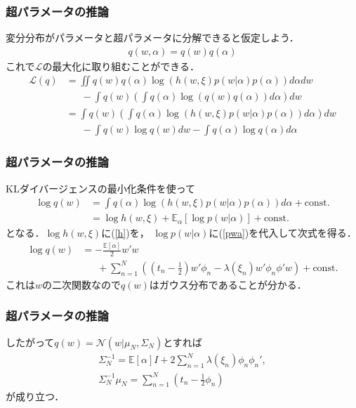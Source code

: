 \documentclass[10pt,usepdftitle=false,hyperref={unicode}]{beamer}
\newcommand{\paref}[1]{{\fontfamily{cmr}\selectfont (\ref{#1})}}
\newcommand{\parentheses}[1]{\left(#1\right)}
\newcommand{\brackets}[1]{\left[#1\right]}
\newcommand{\const}{\mathrm{const.}}
\newcommand{\energy}{\mathcal{L}}
\begin{document}
\begin{frame}
\frametitle{超パラメータの推論}
変分分布がパラメータと超パラメータに分解できると仮定しよう．
\begin{align}
    q\parentheses{w, \alpha} = q\parentheses{w}q\parentheses{\alpha} \tag{10.173}
\end{align}
これで$\energy$の最大化に取り組むことができる．
\begin{align*}
    \energy\parentheses{q}
    &= \iint q\parentheses{w}q\parentheses{\alpha} \log \parentheses{h\parentheses{w,\xi}p\parentheses{w|\alpha}p\parentheses{\alpha}} d\alpha dw \\
    &\phantom{=}\ -\int q\parentheses{w}\parentheses{\int q\parentheses{\alpha} \log\parentheses{q\parentheses{w}q\parentheses{\alpha}} d\alpha} dw \\
    &= \int q\parentheses{w}\parentheses{\int q\parentheses{\alpha} \log \parentheses{h\parentheses{w,\xi}p\parentheses{w|\alpha}p\parentheses{\alpha}} d\alpha} dw \\
    &\phantom{=}\ -\int q\parentheses{w} \log q\parentheses{w} dw
            -\int q\parentheses{\alpha} \log q\parentheses{\alpha} d\alpha
\end{align*}
\end{frame}

\begin{frame}
\frametitle{超パラメータの推論}
KLダイバージェンスの最小化条件を使って
\begin{align*}
    \log q\parentheses{w}
    &= \int q\parentheses{\alpha} \log \parentheses{h\parentheses{w,\xi}p\parentheses{w|\alpha}p\parentheses{\alpha}} d\alpha + \const \\
    &= \log h\parentheses{w,\xi} + \mathbb{E}_\alpha \brackets{\log p\parentheses{w|\alpha}} + \const
\end{align*}
となる．$\log h\parentheses{w,\xi}$に\paref{h}を，
$\log p\parentheses{w|\alpha}$に\paref{pwa}を代入して次式を得る．
\setlength{\fboxsep}{2pt}
\begin{align*}
    \log q\parentheses{w}
    &= -\frac{\mathbb{E}\brackets{\alpha}}{2}w'w \\
    &\phantom{=}\ + \sum_{n = 1}^N \parentheses{\parentheses{t_n - \frac{1}{2}}w'\phi_n - \lambda\parentheses{\xi_n}w'\phi_n\phi'w} + \const
\end{align*}
これは$w$の二次関数なので$q\parentheses{w}$はガウス分布であることが分かる．
\end{frame}

\begin{frame}
\frametitle{超パラメータの推論}
したがって$q\parentheses{w} = \mathcal{N}\parentheses{w|\mu_N, \varSigma_N}$とすれば
\begin{gather}
    \varSigma_{N}^{-1} = \mathbb{E}\brackets{\alpha}I + 2 \sum_{n = 1}^N \lambda\parentheses{\xi_n}\phi_n\phi_n', \tag{10.176} \\
    \varSigma_{N}^{-1} \mu_N = \sum_{n = 1}^N \parentheses{t_n - \frac{1}{2}\phi_n} \tag{10.175}
\end{gather}
が成り立つ．
\end{frame}
\end{document}

